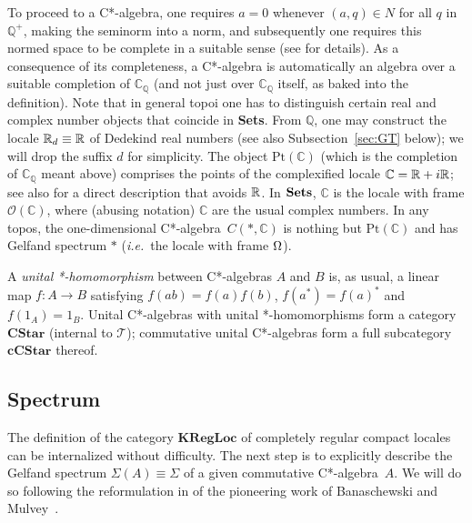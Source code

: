 \documentclass[11pt]{article}
\newcommand{\Q}{\mathbb{Q}}
\newcommand{\Sets}{\mbox{\textbf{Sets}}}
\newcommand{\ca}{C*-algebra} \newcommand{\jba}{JB-algebra}
\newcommand{\Sg}{\Sigma} \newcommand{\ta}{\tau} \newcommand{\ph}{\phi}
\newcommand{\CO}{{\mathcal O}} \newcommand{\CP}{{\mathcal P}}
\newcommand{\CT}{{\mathcal T}} \newcommand{\CV}{{\mathcal V}}
\newcommand{\C}{{\mathbb C}} \newcommand{\D}{{\mathbb D}}
\newcommand{\Cat}[1]{\ensuremath{\mathrm{\textbf{#1}}}}
\newcommand{\Cstar}{\Cat{CStar}\xspace}
\newcommand{\Ccstar}{\Cat{cCStar}\xspace}
\newcommand{\cpxrat}{\ensuremath{\field{C}_\field{Q}}}
\newcommand{\field}[1]{\ensuremath{\mathbb{#1}}}
\newcommand{\ie}{\textit{i.e.}}
\begin{document}
To proceed to a C*-algebra, one requires $a=0$ whenever
$(a,q)\in N$ for all $q$ in $\field{Q}^+$, making the seminorm into a
norm, and subsequently one requires this normed space to be complete in a
suitable sense (see \cite{banaschewskimulvey06} for details).
As a  consequence of its completeness, a C*-algebra is automatically an algebra
over
a suitable completion of $\cpxrat$ (and not just over $\cpxrat$ itself, as baked
into the definition).
Note that in general topoi one has to distinguish certain real and complex
number objects that coincide in \Sets.
From $\Q$, one may construct  the locale  ${\mathbb R}_d\equiv{\mathbb R}$ of Dedekind real numbers
\cite[\S~VI.8]{maclanemoerdijk92} (see also
Subsection~\ref{sec:GT} below); we will drop the suffix $d$ for simplicity.  The object $\mathrm{Pt}(\C)$ (which
is the completion of $\cpxrat$ meant above)
 comprises the points of the
complexified locale $\C=\R+i\R$; see also \cite{banaschewskimulvey06} for
a direct description that avoids ${\mathbb R}$.
 In $\Sets$, $\C$ is the locale with frame $\CO(\C)$, where (abusing notation) $\C$ are the usual
complex numbers. In any topos,
the one-dimensional \ca\ $C(*,\C)$
is nothing but $\mathrm{Pt}(\C)$ and has Gelfand spectrum $*$ (\ie\ the locale
with frame $\Omega$).

A \emph{unital *-homomorphism} between C*-algebras ${A}$
and ${B}$ is, as usual,  a linear map $f:{A}\to{B}$ satisfying
$f(ab)=f(a)f(b)$, $f(a^*) = {f(a)}^*$ and $f(1_A)=1_B$.  Unital C*-algebras
with unital *-homomorphisms form a category $\Cstar$ (internal to $\CT$);
commutative unital C*-algebras form a full subcategory $\Ccstar$ thereof.
\subsection{Spectrum}\label{subsec:spectrum}
The definition of the category $\Cat{KRegLoc}$ of completely regular compact
locales
can be internalized without difficulty. The next step is to explicitly describe
the Gelfand spectrum $\Sg({A})\equiv\Sg$ of a given commutative \ca\ ${A}$. We
will do so following  the reformulation in
\cite{coquand05,CoquandSpitters:cstar} of the pioneering work of
Banaschewski and Mulvey~\cite{banaschewskimulvey06}.
\end{document}
